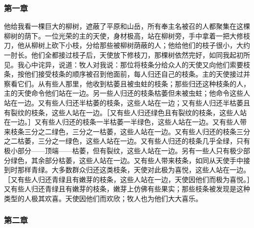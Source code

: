 \par


\subsubsection{第一章}

他给我看一棵巨大的柳树，遮蔽了平原和山岳，所有奉主名被召的人都聚集在这棵柳树的荫下。一位光荣的主的天使，身材极高，站在柳树旁，手中拿着一把大修枝刀，他从柳树上砍下小枝，分给那些被柳树荫蔽的人；他给他们的枝子很小，大约一肘长。他们全都接过枝子后，天使放下修枝刀，那棵树依然完好，如同我起初所见。我心中诧异，说道：牧人对我说：那位将枝条分给众人的天使又向他们索要枝条，按他们接受枝条的顺序被召到他面前，每人归还自己的枝条。主的天使接过并察看它们。从有些人那里，他收到枯萎且被虫蛀的枝条；那些归还这种枝条的人，主的天使命令他们站在一边。另一些人归还的枝条枯萎但未被虫蛀；他命令这些人站在一边。又有些人归还半枯萎的枝条，这些人站在一边；又有些人归还半枯萎且有裂纹的枝条，这些人站在一边。［又有些人归还绿色且有裂纹的枝条，这些人站在一边。］又有些人归还的枝条一半枯萎一半绿色，这些人站在一边。又有些人带来枝条三分之二绿色，三分之一枯萎，这些人站在一边。又有些人归还的枝条三分之二枯萎，三分之一绿色，这些人站在一边。又有些人归还的枝条几乎全绿，只有极小部分——顶端——枯萎，但有裂纹，这些人站在一边。另有一些人只有极少部分绿色，其余部分枯萎，这些人站在一边。又有些人带来枝条，如同从天使手中接到时那样青绿。大多数群众归还这类枝条，天使对此极为喜悦，这些人站在一边。［又有些人归还青绿且有嫩芽的枝条，这些人站在一边，天使因他们而极为喜悦。］又有些人归还青绿且有嫩芽的枝条，嫩芽上仿佛有些果实；那些枝条被发现是这种类型的人极其欢喜。天使因他们而欢欣；牧人也为他们大大喜乐。\par


\subsubsection{第二章}

